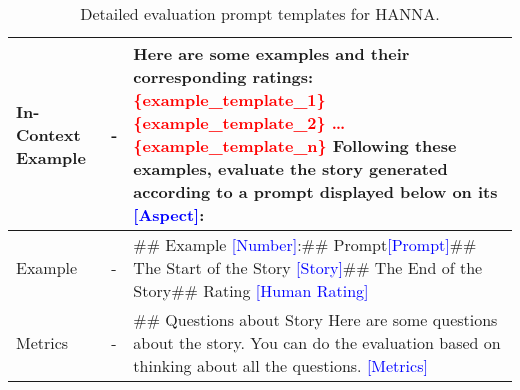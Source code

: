 \begin{table*} [t]
{\begin{tabular}{l l >{\raggedright\arraybackslash}m{}}
\midrule
\multirow{1}{*}{In-Context Example} & - & Here are some examples and their corresponding ratings: \newline
\textcolor{red}{\{example\_template\_1\}} \newline
\textcolor{red}{\{example\_template\_2\}} \newline
\textcolor{red}{…} \newline
\textcolor{red}{\{example\_template\_n\}}\newline\newline
Following these examples, evaluate the story generated according to a prompt displayed below on its \textcolor{blue}{[Aspect]}: \\
\midrule
Example & - & \#\# Example \textcolor{blue}{[Number]}:\newline \#\# Prompt\newline\textcolor{blue}{[Prompt]}\newline\newline \#\# The Start of the Story \newline\textcolor{blue}{[Story]}\newline \#\# The End of the Story\newline\newline \#\# Rating \newline \textcolor{blue}{[Human Rating]}\\
\midrule
\multirow{1}{*}{Metrics} & - & \#\# Questions about Story \newline
Here are some questions about the story. You can do the evaluation based on thinking about all the questions. \newline
\textcolor{blue}{[Metrics]} \\
\bottomrule
\end{tabular}
}
\vspace{-2mm}
\caption{Detailed evaluation prompt templates for HANNA. }
\label{tab:evaluation_prompt_hanna}
\end{table*}